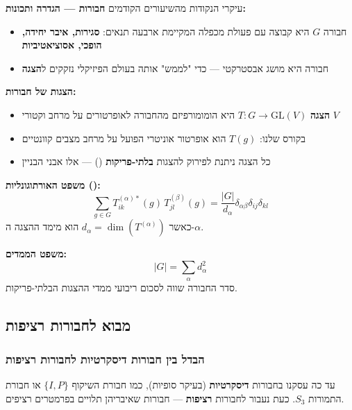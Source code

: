 \begin{summarybox}{עיקרי הנקודות מהשיעורים הקודמים}
\textbf{חבורות — הגדרה ותכונות:}
\begin{itemize}
    \item חבורה $G$ היא קבוצה עם פעולת מכפלה המקיימת ארבעה תנאים: \textbf{סגירות, איבר יחידה, הופכי, אסוציאטיביות}
    \item חבורה היא מושג אבסטרקטי — כדי "לממש" אותה בעולם הפיזיקלי נזקקים ל\textbf{הצגה}
\end{itemize}

\textbf{הצגות של חבורות:}
\begin{itemize}
    \item \textbf{הצגה} $T: G \to \text{GL}(V)$ היא הומומורפיזם מהחבורה לאופרטורים על מרחב וקטורי $V$
    \item בקורס שלנו: $T(g)$ הוא אופרטור אוניטרי הפועל על מרחב מצבים קוונטיים
    \item כל הצגה ניתנת לפירוק להצגות \textbf{בלתי-פריקות} () — אלו אבני הבניין
\end{itemize}

\textbf{משפט האורתוגונליות ():}
\begin{equation}
\sum_{g\in G}T^{(\alpha)*}_{ik}(g) \, T^{(\beta)}_{jl}(g) = \frac{|G|}{d_\alpha}\delta_{\alpha\beta}\delta_{ij}\delta_{kl}
\end{equation}
כאשר $d_\alpha = \dim(T^{(\alpha)})$ הוא מימד ההצגה ה-$\alpha$.

\textbf{משפט הממדים:}
\begin{equation}
|G| = \sum_{\alpha} d_\alpha^2
\end{equation}
סדר החבורה שווה לסכום ריבועי ממדי ההצגות הבלתי-פריקות.
\end{summarybox}


\subsection{מבוא לחבורות רציפות}

\subsubsection{הבדל בין חבורות דיסקרטיות לחבורות רציפות}

עד כה עסקנו בחבורות \textbf{דיסקרטיות} (בעיקר סופיות), כמו חבורת השיקוף $\{I, P\}$ או חבורת התמורות $S_3$. כעת נעבור לחבורות \textbf{רציפות} — חבורות שאיבריהן תלויים בפרמטרים רציפים.

